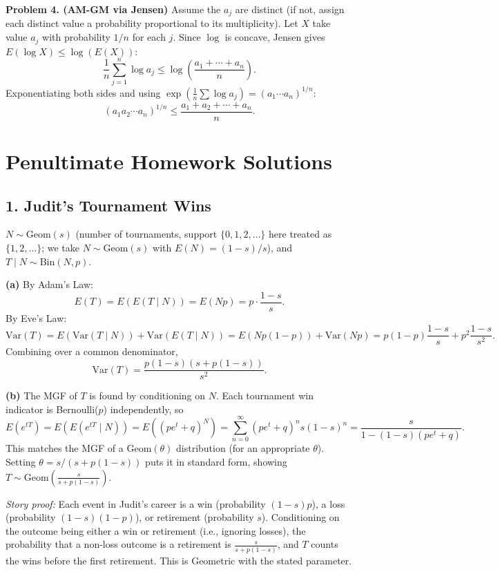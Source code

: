 \documentclass{article}
\begin{document}
\bigskip
\textbf{Problem 4. (AM-GM via Jensen)} Assume the $a_j$ are distinct (if not, assign each distinct value a probability proportional to its multiplicity). Let $X$ take value $a_j$ with probability $1/n$ for each $j$. Since $\log$ is concave, Jensen gives $E(\log X)\le\log(E(X))$:
$$
\frac{1}{n}\sum_{j=1}^n\log a_j\le\log\!\left(\frac{a_1+\cdots+a_n}{n}\right).
$$
Exponentiating both sides and using $\exp\!\left(\frac{1}{n}\sum\log a_j\right)=(a_1\cdots a_n)^{1/n}$:
$$
(a_1 a_2\cdots a_n)^{1/n}\le\frac{a_1+a_2+\cdots+a_n}{n}.
$$

\bigskip
\section*{Penultimate Homework Solutions}

\subsection*{1. Judit's Tournament Wins}

$N\sim\text{Geom}(s)$ (number of tournaments, support $\{0,1,2,\dots\}$ here treated as $\{1,2,\dots\}$; we take $N\sim\text{Geom}(s)$ with $E(N)=(1-s)/s$), and $T\mid N\sim\text{Bin}(N,p)$.

\textbf{(a)} By Adam's Law:
$$
E(T)=E(E(T\mid N))=E(Np)=p\cdot\frac{1-s}{s}.
$$
By Eve's Law:
$$
\text{Var}(T)=E(\text{Var}(T\mid N))+\text{Var}(E(T\mid N))=E(Np(1-p))+\text{Var}(Np)=p(1-p)\frac{1-s}{s}+p^2\frac{1-s}{s^2}.
$$
Combining over a common denominator,
$$
\text{Var}(T)=\frac{p(1-s)(s+p(1-s))}{s^2}.
$$

\textbf{(b)} The MGF of $T$ is found by conditioning on $N$. Each tournament win indicator is Bernoulli($p$) independently, so
$$
E(e^{tT})=E\!\left(E(e^{tT}\mid N)\right)=E\!\left((pe^t+q)^N\right)=\sum_{n=0}^\infty(pe^t+q)^n s(1-s)^n=\frac{s}{1-(1-s)(pe^t+q)}.
$$
This matches the MGF of a $\text{Geom}(\theta)$ distribution (for an appropriate $\theta$). Setting $\theta=s/(s+p(1-s))$ puts it in standard form, showing $T\sim\text{Geom}\!\left(\frac{s}{s+p(1-s)}\right)$.

\emph{Story proof:} Each event in Judit's career is a win (probability $(1-s)p$), a loss (probability $(1-s)(1-p)$), or retirement (probability $s$). Conditioning on the outcome being either a win or retirement (i.e., ignoring losses), the probability that a non-loss outcome is a retirement is $\frac{s}{s+p(1-s)}$, and $T$ counts the wins before the first retirement. This is Geometric with the stated parameter.
\end{document}
